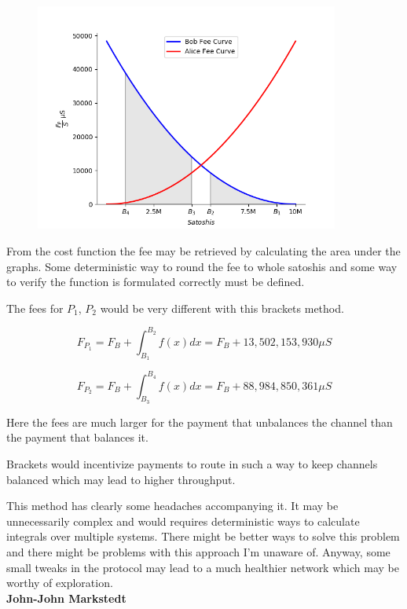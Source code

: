 \begin{figure}[!htb]
	\vspace{-0.7cm}
	\centering
	\includegraphics[width=10cm]{images/fee_scheme.png}
	\label{fig:xt_nodes}
\end{figure}
\newpage

From the cost function the fee may be retrieved by calculating the area under the graphs. Some deterministic way to round the fee to whole satoshis and some way to verify the function is formulated correctly must be defined. 

The fees for $P_1$, $P_2$ would be very different with this brackets method.

\[ F_{P_1} = F_{B} + \int_{B_1}^{B_2} f(x) dx = F_B + 13,502,153,930 μS \]

\[ F_{P_2} = F_{B} + \int_{B_3}^{B_4} f(x) dx  = F_B + 88,984,850,361 μS \]
 
Here the fees are much larger for the payment that unbalances the channel than the payment that balances it. 

Brackets would incentivize payments to route in such a way to keep channels balanced which may lead to higher throughput. %

This method has clearly some headaches accompanying it. It may be unnecessarily complex and would requires deterministic ways to calculate integrals over multiple systems. There might be better ways to solve this problem and there might be problems with this approach I'm unaware of. Anyway, some small tweaks in the protocol may lead to a much healthier network which may be worthy of exploration.\\

\textbf{John-John Markstedt}

